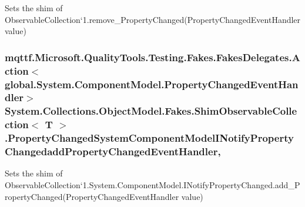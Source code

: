 Sets the shim of Observable\-Collection`1.remove\-\_\-\-Property\-Changed(\-Property\-Changed\-Event\-Handler value)

\hypertarget{class_system_1_1_collections_1_1_object_model_1_1_fakes_1_1_shim_observable_collection_3_01_t_01_4_a3a05bb45eafd5adcd754656769dcc0bb}{
\subsubsection[{Property\-Changed\-System\-Component\-Model\-I\-Notify\-Property\-Changedadd\-Property\-Changed\-Event\-Handler}]{\setlength{\rightskip}{0pt plus 5cm}mqttf.\-Microsoft.\-Quality\-Tools.\-Testing.\-Fakes.\-Fakes\-Delegates.\-Action$<$global.\-System.\-Component\-Model.\-Property\-Changed\-Event\-Handler$>$ System.\-Collections.\-Object\-Model.\-Fakes.\-Shim\-Observable\-Collection$<$ T $>$.Property\-Changed\-System\-Component\-Model\-I\-Notify\-Property\-Changedadd\-Property\-Changed\-Event\-Handler\hspace{0.3cm}{\ttfamily [set]}, {\ttfamily [add]}}}\label{class_system_1_1_collections_1_1_object_model_1_1_fakes_1_1_shim_observable_collection_3_01_t_01_4_a3a05bb45eafd5adcd754656769dcc0bb}


Sets the shim of Observable\-Collection`1.System.\-Component\-Model.\-I\-Notify\-Property\-Changed.\-add\-\_\-\-Property\-Changed(\-Property\-Changed\-Event\-Handler value)

